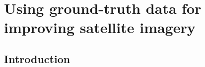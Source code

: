 \chapter[Using ground-truth data for improving satellite imagery]{Using ground-truth data for improving satellite imagery}
\label{Chap6}


\section{Introduction}
\label{Chap6_sec:Introduction}

%	
%	
